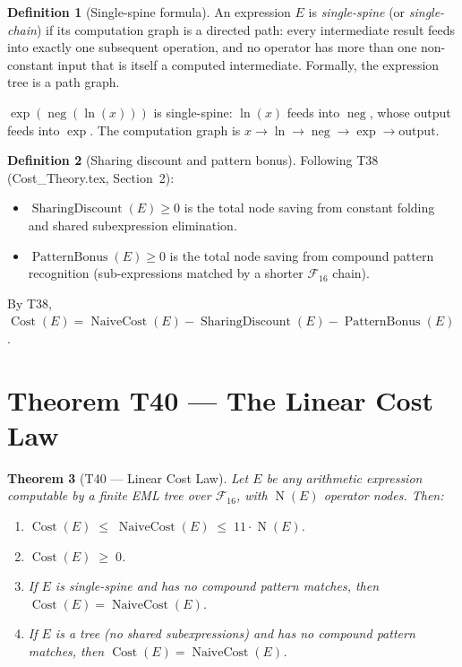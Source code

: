\documentclass[12pt,a4paper]{article}
\newtheorem{theorem}{Theorem}[section]
\theoremstyle{definition}
\newtheorem{definition}[theorem]{Definition}
\newcommand{\Cost}{\operatorname{Cost}}
\newcommand{\NC}{\operatorname{NaiveCost}}
\newcommand{\SD}{\operatorname{SharingDiscount}}
\newcommand{\PB}{\operatorname{PatternBonus}}
\newcommand{\NOp}{\operatorname{N}}
\begin{document}
\begin{definition}[Single-spine formula]
\label{def:spine}
An expression $E$ is \emph{single-spine} (or \emph{single-chain}) if its
computation graph is a directed path: every intermediate result feeds into
exactly one subsequent operation, and no operator has more than one
non-constant input that is itself a computed intermediate.
Formally, the expression tree is a path graph.

\begin{example*}
$\exp(\operatorname{neg}(\ln(x)))$ is single-spine: $\ln(x)$ feeds into
$\operatorname{neg}$, whose output feeds into $\exp$.  The computation graph is
$x \to \ln \to \operatorname{neg} \to \exp \to \text{output}$.
\end{example*}
\end{definition}

\begin{definition}[Sharing discount and pattern bonus]
\label{def:sdpb}
Following T38 (Cost\_Theory.tex, Section~2):
\begin{itemize}
  \item $\SD(E) \geq 0$ is the total node saving from constant folding and
        shared subexpression elimination.
  \item $\PB(E) \geq 0$ is the total node saving from compound pattern
        recognition (sub-expressions matched by a shorter $\mathcal{F}_{16}$
        chain).
\end{itemize}
By T38, $\Cost(E) = \NC(E) - \SD(E) - \PB(E)$.
\end{definition}

\section{Theorem T40 — The Linear Cost Law}
\label{sec:T40}

\begin{theorem}[T40 --- Linear Cost Law]
\label{thm:T40}
Let $E$ be any arithmetic expression computable by a finite EML tree over
$\mathcal{F}_{16}$, with $\NOp(E)$ operator nodes.  Then:
\begin{enumerate}
  \item[\textup{(i)}] $\Cost(E) \;\leq\; \NC(E) \;\leq\; 11 \cdot \NOp(E)$.
  \item[\textup{(ii)}] $\Cost(E) \;\geq\; 0$.
  \item[\textup{(iii)}] If $E$ is single-spine and has no compound pattern
        matches, then $\Cost(E) = \NC(E)$.
  \item[\textup{(iv)}] If $E$ is a tree (no shared subexpressions) and has no
        compound pattern matches, then $\Cost(E) = \NC(E)$.
\end{enumerate}
\end{theorem}
\end{document}
